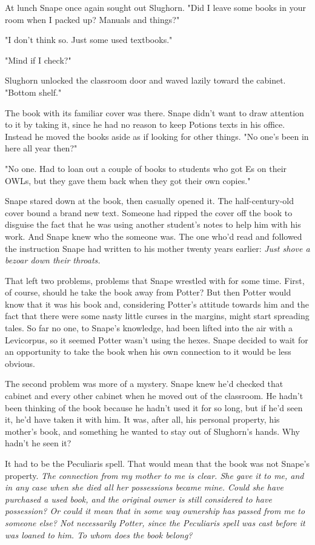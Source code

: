 At lunch Snape once again sought out Slughorn. "Did I leave some books in your room when I packed up? Manuals and things?"

"I don't think so. Just some used textbooks."

"Mind if I check?"

Slughorn unlocked the classroom door and waved lazily toward the cabinet. "Bottom shelf."

The book with its familiar cover was there. Snape didn't want to draw attention to it by taking it, since he had no reason to keep Potions texts in his office. Instead he moved the books aside as if looking for other things. "No one's been in here all year then?"

"No one. Had to loan out a couple of books to students who got Es on their OWLs, but they gave them back when they got their own copies."

Snape stared down at the book, then casually opened it. The half-century-old cover bound a brand new text. Someone had ripped the cover off the book to disguise the fact that he was using another student's notes to help him with his work. And Snape knew who the someone was. The one who'd read and followed the instruction Snape had written to his mother twenty years earlier: \emph{Just shove a bezoar down their throats.}

That left two problems, problems that Snape wrestled with for some time. First, of course, should he take the book away from Potter? But then Potter would know that it was his book and, considering Potter's attitude towards him and the fact that there were some nasty little curses in the margins, might start spreading tales. So far no one, to Snape's knowledge, had been lifted into the air with a Levicorpus, so it seemed Potter wasn't using the hexes. Snape decided to wait for an opportunity to take the book when his own connection to it would be less obvious.

The second problem was more of a mystery. Snape knew he'd checked that cabinet and every other cabinet when he moved out of the classroom. He hadn't been thinking of the book because he hadn't used it for so long, but if he'd seen it, he'd have taken it with him. It was, after all, his personal property, his mother's book, and something he wanted to stay out of Slughorn's hands. Why hadn't he seen it?

It had to be the Peculiaris spell. That would mean that the book was not Snape's property. \emph{The connection from my mother to me is clear. She gave it to me, and in any case when she died all her possessions became mine. Could she have purchased a used book, and the original owner is still considered to have possession? Or could it mean that in some way ownership has passed from me to someone else? Not necessarily Potter, since the Peculiaris spell was cast before it was loaned to him. To whom does the book belong?}

